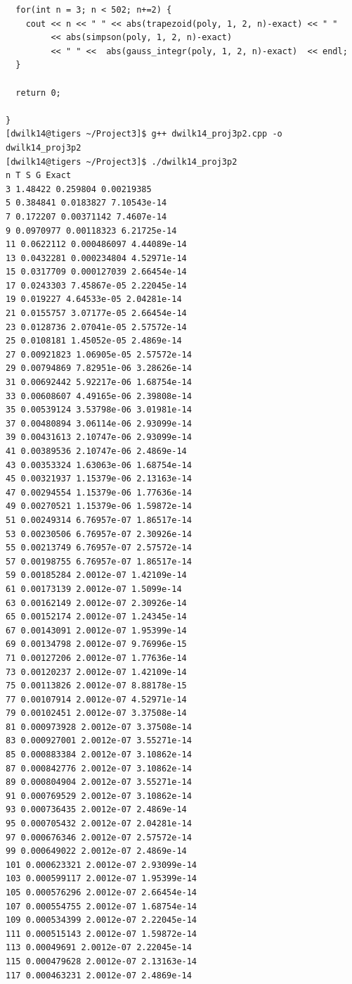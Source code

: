 \documentclass{article}
\begin{document}
\begin{verbatim}
  for(int n = 3; n < 502; n+=2) {
    cout << n << " " << abs(trapezoid(poly, 1, 2, n)-exact) << " " 
         << abs(simpson(poly, 1, 2, n)-exact)
         << " " <<  abs(gauss_integr(poly, 1, 2, n)-exact)  << endl;
  }

  return 0;

}
[dwilk14@tigers ~/Project3]$ g++ dwilk14_proj3p2.cpp -o dwilk14_proj3p2
[dwilk14@tigers ~/Project3]$ ./dwilk14_proj3p2
n T S G Exact
3 1.48422 0.259804 0.00219385
5 0.384841 0.0183827 7.10543e-14
7 0.172207 0.00371142 7.4607e-14
9 0.0970977 0.00118323 6.21725e-14
11 0.0622112 0.000486097 4.44089e-14
13 0.0432281 0.000234804 4.52971e-14
15 0.0317709 0.000127039 2.66454e-14
17 0.0243303 7.45867e-05 2.22045e-14
19 0.019227 4.64533e-05 2.04281e-14
21 0.0155757 3.07177e-05 2.66454e-14
23 0.0128736 2.07041e-05 2.57572e-14
25 0.0108181 1.45052e-05 2.4869e-14
27 0.00921823 1.06905e-05 2.57572e-14
29 0.00794869 7.82951e-06 3.28626e-14
31 0.00692442 5.92217e-06 1.68754e-14
33 0.00608607 4.49165e-06 2.39808e-14
35 0.00539124 3.53798e-06 3.01981e-14
37 0.00480894 3.06114e-06 2.93099e-14
39 0.00431613 2.10747e-06 2.93099e-14
41 0.00389536 2.10747e-06 2.4869e-14
43 0.00353324 1.63063e-06 1.68754e-14
45 0.00321937 1.15379e-06 2.13163e-14
47 0.00294554 1.15379e-06 1.77636e-14
49 0.00270521 1.15379e-06 1.59872e-14
51 0.00249314 6.76957e-07 1.86517e-14
53 0.00230506 6.76957e-07 2.30926e-14
55 0.00213749 6.76957e-07 2.57572e-14
57 0.00198755 6.76957e-07 1.86517e-14
59 0.00185284 2.0012e-07 1.42109e-14
61 0.00173139 2.0012e-07 1.5099e-14
63 0.00162149 2.0012e-07 2.30926e-14
65 0.00152174 2.0012e-07 1.24345e-14
67 0.00143091 2.0012e-07 1.95399e-14
69 0.00134798 2.0012e-07 9.76996e-15
71 0.00127206 2.0012e-07 1.77636e-14
73 0.00120237 2.0012e-07 1.42109e-14
75 0.00113826 2.0012e-07 8.88178e-15
77 0.00107914 2.0012e-07 4.52971e-14
79 0.00102451 2.0012e-07 3.37508e-14
81 0.000973928 2.0012e-07 3.37508e-14
83 0.000927001 2.0012e-07 3.55271e-14
85 0.000883384 2.0012e-07 3.10862e-14
87 0.000842776 2.0012e-07 3.10862e-14
89 0.000804904 2.0012e-07 3.55271e-14
91 0.000769529 2.0012e-07 3.10862e-14
93 0.000736435 2.0012e-07 2.4869e-14
95 0.000705432 2.0012e-07 2.04281e-14
97 0.000676346 2.0012e-07 2.57572e-14
99 0.000649022 2.0012e-07 2.4869e-14
101 0.000623321 2.0012e-07 2.93099e-14
103 0.000599117 2.0012e-07 1.95399e-14
105 0.000576296 2.0012e-07 2.66454e-14
107 0.000554755 2.0012e-07 1.68754e-14
109 0.000534399 2.0012e-07 2.22045e-14
111 0.000515143 2.0012e-07 1.59872e-14
113 0.00049691 2.0012e-07 2.22045e-14
115 0.000479628 2.0012e-07 2.13163e-14
117 0.000463231 2.0012e-07 2.4869e-14

\end{verbatim}
\end{document}

